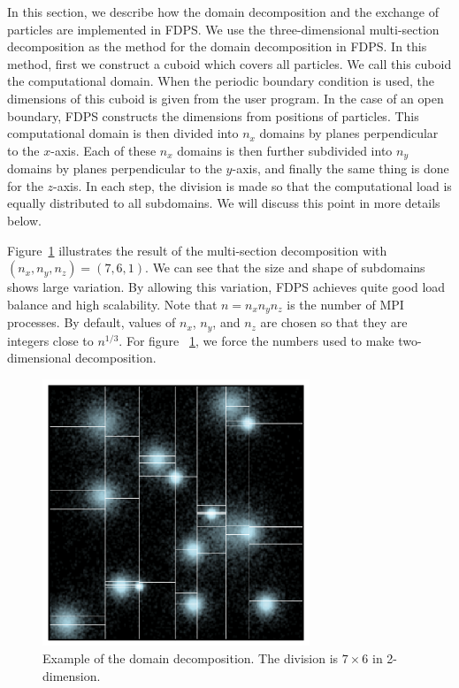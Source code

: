 In this section, we describe how the domain decomposition and the
exchange of particles are implemented in FDPS.  We use the
three-dimensional multi-section
decomposition \cite{2004PASJ...56..521M} as the method for the domain
decomposition in FDPS.  In this method, first we construct a cuboid
which covers all particles. We call this cuboid the computational
domain. When the periodic boundary condition is used, the dimensions
of this cuboid is given from the user program. In the case of an open
boundary, FDPS constructs the dimensions from positions of
particles. This computational domain is then divided into $n_x$
domains by planes perpendicular to the $x$-axis. Each of these $n_x$
domains is then further subdivided into $n_y$ domains by planes
perpendicular to the $y$-axis, and finally the same thing is done for
the $z$-axis.  In each step, the division is made so that the
computational load is equally distributed to all subdomains. We will
discuss this point in more details below.

Figure~\ref{fig:decomposition} illustrates the result of the
multi-section decomposition with $(n_x, n_y, n_z)=(7,6,1)$. We can see
that the size and shape of subdomains shows large variation. By
allowing this variation, FDPS achieves quite good load balance and
high scalability.  Note that $n=n_x n_y n_z$ is the number of MPI
processes. By default, values of $n_x$, $n_y$, and $n_z$ are chosen so
that they are integers close to $n^{1/3}$. For figure
~\ref{fig:decomposition}, we force the numbers used to make
two-dimensional decomposition.

\begin{figure}
  \begin{center}
    \includegraphics[width=8cm]{fig/pm3d.eps}
  \end{center}
  \caption{Example of the domain decomposition. The division is $7
    \times 6$ in 2-dimension.}
  \label{fig:decomposition}
\end{figure}

